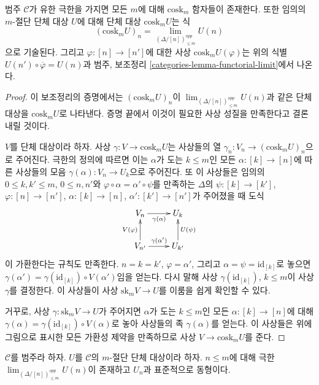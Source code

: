 \begin{lemma}
\label{lemma-existence-cosk}
범주 $\mathcal{C}$가 유한 극한을 가지면 모든 $m$에 대해
$\text{cosk}_m$ 함자들이 존재한다. 또한 임의의 $m$-절단 단체 대상
$U$에 대해 단체 대상 $\text{cosk}_mU$는 식
$$
(\text{cosk}_mU)_n = \lim_{(\Delta/[n])_{\leq m}^{opp}} U(n)
$$
으로 기술된다. 그리고 $\varphi : [n] \to [n']$에 대한 사상
$\text{cosk}_mU(\varphi)$는 위의 식별
$U(n') \circ \overline{\varphi} = U(n)$과 범주, 보조정리
\ref{categories-lemma-functorial-limit}에서 나온다.
\end{lemma}

\begin{proof}
이 보조정리의 증명에서는 $(\text{cosk}_mU)_n$이
$\lim_{(\Delta/[n])_{\leq m}^{opp}} U(n)$과 같은 단체 대상을
$\text{cosk}_mU$로 나타낸다. 증명 끝에서 이것이 필요한 사상 성질을
만족한다고 결론 내릴 것이다.

\medskip\noindent
$V$를 단체 대상이라 하자.
사상 $\gamma : V \to \text{cosk}_mU$는 사상들의 열
$\gamma_n : V_n \to (\text{cosk}_mU)_n$으로 주어진다.
극한의 정의에 따르면 이는 $\alpha$가 도는 $k \leq m$인 모든
$\alpha : [k] \to [n]$에 따른 사상들의 모음
$\gamma(\alpha) : V_n \to U_k$으로 주어진다.
또 이 사상들은 임의의 $0 \leq k, k' \leq m$, $0 \leq n, n'$와
$\varphi \circ \alpha = \alpha' \circ \psi$를 만족하는 $\Delta$의
$\psi : [k] \to [k']$, $\varphi : [n] \to [n']$,
$\alpha : [k] \to [n]$, $\alpha' : [k'] \to [n']$가 주어졌을 때 도식
$$
\xymatrix{
V_n \ar[r]_{\gamma(\alpha)} &  U_k \\
V_{n'} \ar[r]^{\gamma(\alpha')} \ar[u]^{V(\varphi)} & U_{k'} \ar[u]_{U(\psi)}
}
$$
이 가환한다는 규칙도 만족한다.
$n = k = k'$, $\varphi = \alpha'$, 그리고
$\alpha = \psi = \text{id}_{[k]}$로 놓으면
$\gamma(\alpha') = \gamma(\text{id}_{[k]}) \circ V(\alpha')$임을 얻는다.
다시 말해 사상 $\gamma(\text{id}_{[k]})$, $k \leq m$이 사상
$\gamma$를 결정한다. 이 사상들이 사상 $\text{sk}_m V \to U$를
이룸을 쉽게 확인할 수 있다.

\medskip\noindent
거꾸로, 사상 $\gamma : \text{sk}_m V \to U$가 주어지면
$\alpha$가 도는 $k \leq m$인 모든 $\alpha : [k] \to [n]$에 대해
$\gamma(\alpha) = \gamma(\text{id}_{[k]}) \circ V(\alpha)$로 놓아
사상들의 족 $\gamma(\alpha)$를 얻는다. 이 사상들은 위에 그림으로
표시한 모든 가환성 제약을 만족하므로 사상
$V \to \text{cosk}_m U$를 준다.
\end{proof}

\begin{lemma}
\label{lemma-trivial-cosk}
$\mathcal{C}$를 범주라 하자.
$U$를 $\mathcal{C}$의 $m$-절단 단체 대상이라 하자.
$n \leq m$에 대해 극한
$\lim_{(\Delta/[n])_{\leq m}^{opp}} U(n)$이 존재하고
$U_n$과 표준적으로 동형이다.
\end{lemma}

